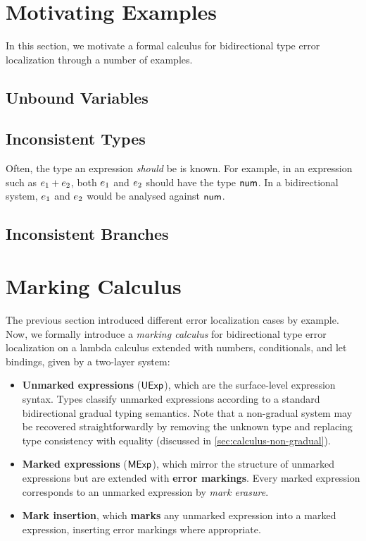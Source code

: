 \section{Motivating Examples}
In this section, we motivate a formal calculus for bidirectional type error localization through a
number of examples.


\subsection{Unbound Variables}

\subsection{Inconsistent Types}
Often, the type an expression \emph{should} be is known. For example, in an expression such as
$e_1 + e_2$, both $e_1$ and $e_2$ should have the type ${\normalfont\textsf{num}}$. In a
bidirectional system, $e_1$ and $e_2$ would be analysed against ${\normalfont\textsf{num}}$.

\subsection{Inconsistent Branches}

\section{Marking Calculus}
\label{sec:calculus}

The previous section introduced different error localization cases by example. Now, we formally
introduce a \emph{marking calculus} for bidirectional type error localization on a lambda calculus
extended with numbers, conditionals, and let bindings, given by a two-layer system:
%
\begin{itemize}
  \item \textbf{Unmarked expressions} (${\normalfont\textsf{UExp}}$), which are the surface-level expression syntax.
    Types classify unmarked expressions according to a standard bidirectional gradual typing
    semantics. Note that a non-gradual system may be recovered straightforwardly by removing the
    unknown type and replacing type consistency with equality (discussed in
    \cref{sec:calculus-non-gradual}).

  \item \textbf{Marked expressions} (${\normalfont\textsf{MExp}}$), which mirror the structure of unmarked expressions
    but are extended with \textbf{error markings}. Every marked expression corresponds to an
    unmarked expression by \emph{mark erasure}.

  \item \textbf{Mark insertion}, which \textbf{marks} any unmarked expression into a marked
    expression, inserting error markings where appropriate.
\end{itemize}

